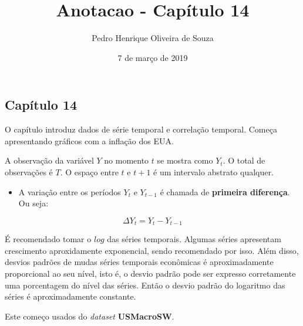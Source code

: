 \documentclass[]{article}
\title{Anotacao - Capítulo 14}
\author{Pedro Henrique Oliveira de Souza}
\date{7 de março de 2019}
\newenvironment{Shaded}{\begin{snugshade}}{\end{snugshade}}
\newcommand{\KeywordTok}[1]{\textcolor[rgb]{0.13,0.29,0.53}{\textbf{#1}}}
\newcommand{\DataTypeTok}[1]{\textcolor[rgb]{0.13,0.29,0.53}{#1}}
\newcommand{\DecValTok}[1]{\textcolor[rgb]{0.00,0.00,0.81}{#1}}
\newcommand{\StringTok}[1]{\textcolor[rgb]{0.31,0.60,0.02}{#1}}
\newcommand{\CommentTok}[1]{\textcolor[rgb]{0.56,0.35,0.01}{\textit{#1}}}
\newcommand{\OperatorTok}[1]{\textcolor[rgb]{0.81,0.36,0.00}{\textbf{#1}}}
\newcommand{\NormalTok}[1]{#1}
\providecommand{\tightlist}{%
  \setlength{\itemsep}{0pt}\setlength{\parskip}{0pt}}
\begin{document}
\maketitle

\subsection{Capítulo 14}\label{capitulo-14}

O capítulo introduz dados de série temporal e correlação temporal.
Começa apresentando gráficos com a inflação dos EUA.

A observação da variável \(Y\) no momento \(t\) se mostra como \(Y_t\).
O total de observações é \(T\). O espaço entre \(t\) e \(t+1\) é um
intervalo abstrato qualquer.

\begin{itemize}
\tightlist
\item
  A variação entre os períodos \(Y_t\) e \(Y_{t-1}\) é chamada de
  \textbf{primeira diferença}. Ou seja:
\end{itemize}

\[\Delta Y_t=Y_t - Y_{t-1}\]

É recomendado tomar o \(log\) das séries temporais. Algumas séries
apresentam crescimento aproxidamente exponencial, sendo recomendado por
isso. Além disso, desvios padrões de mudas séries temporais econômicas é
aproximadamente proporcional ao seu nível, isto é, o desvio padrão pode
ser expresso corretamente uma porcentagem do nível das séries. Então o
desvio padrão do logaritmo das séries é aproximadamente constante.

Este começo usados do \emph{dataset} \textbf{USMacroSW}.

\begin{Shaded}
\end{Shaded}
\end{document}
